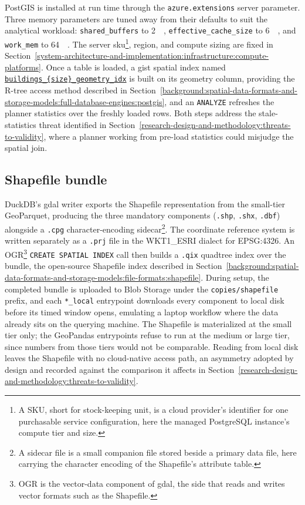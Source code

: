 PostGIS is installed at run time through the \texttt{azure.extensions} server parameter. Three memory parameters are tuned away from their defaults to suit the analytical workload: \texttt{shared\_buffers} to \SI{2}{\gibi\byte}, \texttt{effective\_cache\_size} to \SI{6}{\gibi\byte}, and \texttt{work\_mem} to \SI{64}{\mebi\byte}. The server \acrshort{sku}\footnote{A SKU, short for stock-keeping unit, is a cloud provider's identifier for one purchasable service configuration, here the managed PostgreSQL instance's compute tier and size.}, region, and compute sizing are fixed in Section~\ref{system-architecture-and-implementation:infrastructure:compute-platforms}. Once a table is loaded, a \acrshort{gist} spatial index named \texttt{\url{buildings\_{size}\_geometry\_idx}} is built on its geometry column, providing the R-tree access method described in Section~\ref{background:spatial-data-formats-and-storage-models:full-database-engines:postgis}, and an \texttt{ANALYZE} refreshes the planner statistics over the freshly loaded rows. Both steps address the stale-statistics threat identified in Section~\ref{research-design-and-methodology:threats-to-validity}, where a planner working from pre-load statistics could misjudge the spatial join.

\subsection{Shapefile bundle}
\label{system-architecture-and-implementation:data-layer:shapefile-bundle}
DuckDB's \acrshort{gdal} writer exports the Shapefile representation from the small-tier GeoParquet, producing the three mandatory components (\texttt{.shp}, \texttt{.shx}, \texttt{.dbf}) alongside a \texttt{.cpg} character-encoding sidecar\footnote{A sidecar file is a small companion file stored beside a primary data file, here carrying the character encoding of the Shapefile's attribute table.}. The coordinate reference system is written separately as a \texttt{.prj} file in the WKT1\_ESRI dialect for EPSG:4326. An OGR\footnote{OGR is the vector-data component of \acrshort{gdal}, the side that reads and writes vector formats such as the Shapefile.} \texttt{CREATE SPATIAL INDEX} call then builds a \texttt{.qix} quadtree index over the bundle, the open-source Shapefile index described in Section~\ref{background:spatial-data-formats-and-storage-models:file-formats:shapefile}. During setup, the completed bundle is uploaded to Blob Storage under the \texttt{copies/shapefile} prefix, and each \texttt{*\_local} entrypoint downloads every component to local disk before its timed window opens, emulating a laptop workflow where the data already sits on the querying machine. The Shapefile is materialized at the small tier only; the GeoPandas entrypoints refuse to run at the medium or large tier, since numbers from those tiers would not be comparable. Reading from local disk leaves the Shapefile with no cloud-native access path, an asymmetry adopted by design and recorded against the comparison it affects in Section~\ref{research-design-and-methodology:threats-to-validity}.